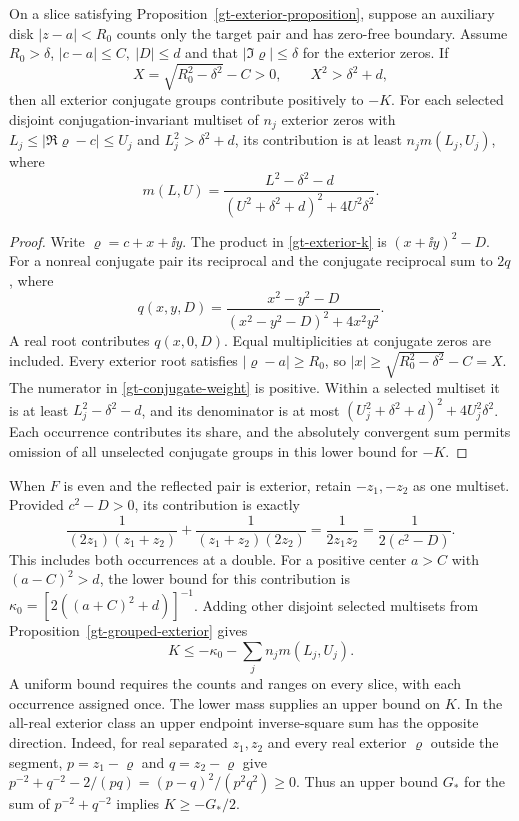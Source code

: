 \begin{proposition}
\label{gt-grouped-exterior}
On a slice satisfying Proposition~\ref{gt-exterior-proposition}, suppose
an auxiliary disk \(|z-a|<R_0\) counts only the target pair and has
zero-free boundary. Assume \(R_0>\delta\), \(|c-a|\le C,\ |D|\le d\)
and that
\(|\Im\varrho|\le\delta\) for the exterior zeros. If
\[
 X=\sqrt{R_0^2-\delta^2}-C>0,\qquad X^2>\delta^2+d ,
\]
then all exterior conjugate groups contribute positively to \(-K\).
For each selected disjoint conjugation-invariant multiset of \(n_j\)
exterior zeros with
\(L_j\le|\Re\varrho-c|\le U_j\) and \(L_j^2>\delta^2+d\), its
contribution is at least \(n_j m(L_j,U_j)\), where
\begin{equation}
 m(L,U)=\frac{L^2-\delta^2-d}
                  {(U^2+\delta^2+d)^2+4U^2\delta^2}.
 \label{gt-group-mass}
\end{equation}
\end{proposition}
\begin{proof}
Write \(\varrho=c+x+\ii y\). The product in \eqref{gt-exterior-k}
is \((x+\ii y)^2-D\). For a nonreal conjugate pair its reciprocal
and the conjugate reciprocal sum to \(2q\), where
\begin{equation}
 q(x,y,D)=\frac{x^2-y^2-D}{(x^2-y^2-D)^2+4x^2y^2}.
 \label{gt-conjugate-weight}
\end{equation}
A real root contributes \(q(x,0,D)\). Equal multiplicities at
conjugate zeros are included. Every exterior root satisfies
\(|\varrho-a|\ge R_0\), so
\(|x|\ge\sqrt{R_0^2-\delta^2}-C=X\).
The numerator in \eqref{gt-conjugate-weight} is positive.
Within a selected multiset it is at least \(L_j^2-\delta^2-d\),
and its denominator is at most
\((U_j^2+\delta^2+d)^2+4U_j^2\delta^2\).
Each occurrence contributes its share, and the absolutely convergent
sum permits omission of all unselected conjugate groups in this
lower bound for \(-K\).
\end{proof}

When \(F\) is even and the reflected pair is exterior, retain
\(-z_1,-z_2\) as one multiset. Provided \(c^2-D>0\), its contribution
is exactly
\[
 \frac{1}{(2z_1)(z_1+z_2)}+\frac{1}{(z_1+z_2)(2z_2)}
   =\frac{1}{2z_1z_2}=\frac{1}{2(c^2-D)} .
\]
This includes both occurrences at a double. For a positive center
\(a>C\) with \((a-C)^2>d\), the lower bound for this contribution
is \(\kappa_0=[2((a+C)^2+d)]^{-1}\).
Adding other disjoint selected multisets from
Proposition~\ref{gt-grouped-exterior} gives
\begin{equation}
 K\le-\kappa_0-\sum_j n_j m(L_j,U_j).
 \label{gt-mirror-allowance}
\end{equation}
A uniform bound requires the counts and ranges on every slice, with
each occurrence assigned once. The lower mass supplies an upper
bound on \(K\). In the all-real exterior class an upper endpoint
inverse-square sum has the opposite direction. Indeed, for real
separated \(z_1,z_2\) and every real exterior \(\varrho\) outside the
segment, \(p=z_1-\varrho\) and \(q=z_2-\varrho\) give
\(p^{-2}+q^{-2}-2/(pq)=(p-q)^2/(p^2q^2)\ge0\). Thus an upper
bound \(G_*\) for the sum of \(p^{-2}+q^{-2}\) implies
\(K\ge -G_*/2\).


